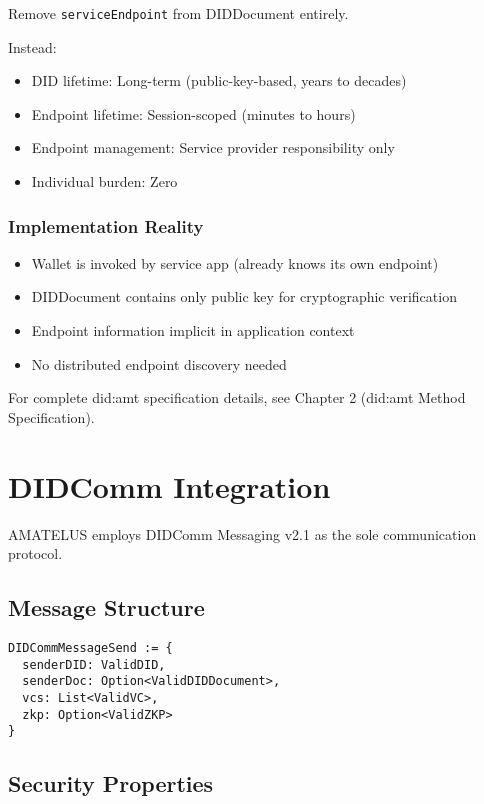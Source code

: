 Remove \texttt{serviceEndpoint} from DIDDocument entirely.

Instead:
\begin{itemize}
  \item DID lifetime: Long-term (public-key-based, years to decades)
  \item Endpoint lifetime: Session-scoped (minutes to hours)
  \item Endpoint management: Service provider responsibility only
  \item Individual burden: Zero
\end{itemize}

\subsubsection{Implementation Reality}

\begin{itemize}
  \item Wallet is invoked by service app (already knows its own endpoint)
  \item DIDDocument contains only public key for cryptographic verification
  \item Endpoint information implicit in application context
  \item No distributed endpoint discovery needed
\end{itemize}

For complete did:amt specification details, see Chapter 2 (did:amt Method Specification).

\section{DIDComm Integration}

AMATELUS employs DIDComm Messaging v2.1 as the sole communication protocol.

\subsection{Message Structure}

\begin{verbatim}
DIDCommMessageSend := {
  senderDID: ValidDID,
  senderDoc: Option<ValidDIDDocument>,
  vcs: List<ValidVC>,
  zkp: Option<ValidZKP>
}
\end{verbatim}

\subsection{Security Properties}

